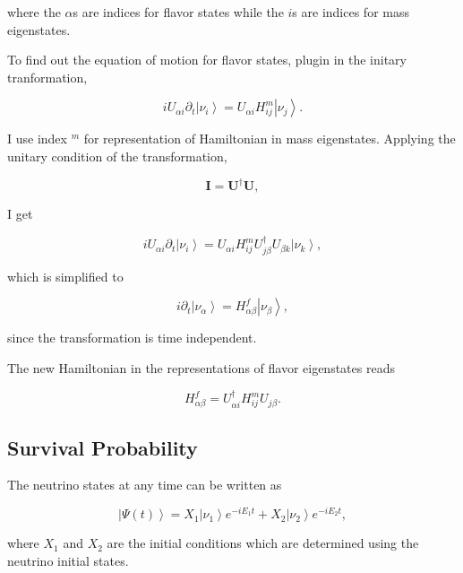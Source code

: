 \documentclass{tufte-handout}
\newcommand{\ket}[1]{\left| #1\right\rangle}
\begin{document}
where the $\alpha$s are indices for flavor states while the $i$s are indices for mass eigenstates.

To find out the equation of motion for flavor states, plugin in the initary tranformation,

\begin{equation}
i  U_{\alpha i} \partial_t \ket{\nu_i} =  U_{\alpha i}  H^m_{ij} \ket{\nu_j}.
\end{equation}

I use index ${}^m$ for representation of Hamiltonian in mass eigenstates. Applying the unitary condition of the transformation,

\begin{equation}
\mathbf I = \mathbf {U^\dagger} \mathbf U,
\end{equation}

I get

\begin{equation}
i U_{\alpha i} \partial_t \ket{\nu_i} =  U_{\alpha i} H^m_{i j}  {U^\dagger_{j\beta}}  U_{\beta k} \ket{\nu_k},
\end{equation}

which is simplified to

\begin{equation}
i \partial_t \ket{\nu_\alpha} = H^f_{\alpha \beta} \ket{\nu_{\beta}},
\end{equation}

since the transformation is time independent.

The new Hamiltonian in the representations of flavor eigenstates reads

\begin{equation}
H^f_{\alpha\beta}  = U^\dagger_{\alpha i} H^m_{ij} U_{j\beta}.
\end{equation}



\subsection{Survival Probability}


The neutrino states at any time can be written as

\begin{equation}
\ket{\Psi(t)}  = X_1 \ket{\nu_1 } e^{-i E_1 t}+ X_2 \ket{ \nu_2 } e^{-i E_2 t},
\end{equation}

where $X_1$ and $X_2$ are the initial conditions which are determined using the neutrino initial states.
\end{document}
